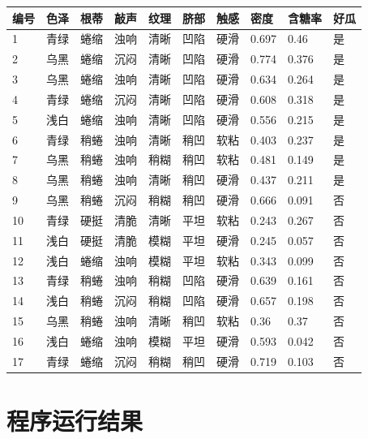 \documentclass{article}
\begin{document}
\begin{table}[!ht]
    \centering
    \begin{tabular}{|l|l|l|l|l|l|l|l|l|l|}
    \hline
        编号 & 色泽 & 根蒂 & 敲声 & 纹理 & 脐部 & 触感 & 密度 & 含糖率 & 好瓜 \\ \hline
        1 & 青绿 & 蜷缩 & 浊响 & 清晰 & 凹陷 & 硬滑 & 0.697 & 0.46 & 是 \\ \hline
        2 & 乌黑 & 蜷缩 & 沉闷 & 清晰 & 凹陷 & 硬滑 & 0.774 & 0.376 & 是 \\ \hline
        3 & 乌黑 & 蜷缩 & 浊响 & 清晰 & 凹陷 & 硬滑 & 0.634 & 0.264 & 是 \\ \hline
        4 & 青绿 & 蜷缩 & 沉闷 & 清晰 & 凹陷 & 硬滑 & 0.608 & 0.318 & 是 \\ \hline
        5 & 浅白 & 蜷缩 & 浊响 & 清晰 & 凹陷 & 硬滑 & 0.556 & 0.215 & 是 \\ \hline
        6 & 青绿 & 稍蜷 & 浊响 & 清晰 & 稍凹 & 软粘 & 0.403 & 0.237 & 是 \\ \hline
        7 & 乌黑 & 稍蜷 & 浊响 & 稍糊 & 稍凹 & 软粘 & 0.481 & 0.149 & 是 \\ \hline
        8 & 乌黑 & 稍蜷 & 浊响 & 清晰 & 稍凹 & 硬滑 & 0.437 & 0.211 & 是 \\ \hline
        9 & 乌黑 & 稍蜷 & 沉闷 & 稍糊 & 稍凹 & 硬滑 & 0.666 & 0.091 & 否 \\ \hline
        10 & 青绿 & 硬挺 & 清脆 & 清晰 & 平坦 & 软粘 & 0.243 & 0.267 & 否 \\ \hline
        11 & 浅白 & 硬挺 & 清脆 & 模糊 & 平坦 & 硬滑 & 0.245 & 0.057 & 否 \\ \hline
        12 & 浅白 & 蜷缩 & 浊响 & 模糊 & 平坦 & 软粘 & 0.343 & 0.099 & 否 \\ \hline
        13 & 青绿 & 稍蜷 & 浊响 & 稍糊 & 凹陷 & 硬滑 & 0.639 & 0.161 & 否 \\ \hline
        14 & 浅白 & 稍蜷 & 沉闷 & 稍糊 & 凹陷 & 硬滑 & 0.657 & 0.198 & 否 \\ \hline
        15 & 乌黑 & 稍蜷 & 浊响 & 清晰 & 稍凹 & 软粘 & 0.36 & 0.37 & 否 \\ \hline
        16 & 浅白 & 蜷缩 & 浊响 & 模糊 & 平坦 & 硬滑 & 0.593 & 0.042 & 否 \\ \hline
        17 & 青绿 & 蜷缩 & 沉闷 & 稍糊 & 稍凹 & 硬滑 & 0.719 & 0.103 & 否 \\ \hline
    \end{tabular}
\end{table}

\section{程序运行结果}
\end{document}
